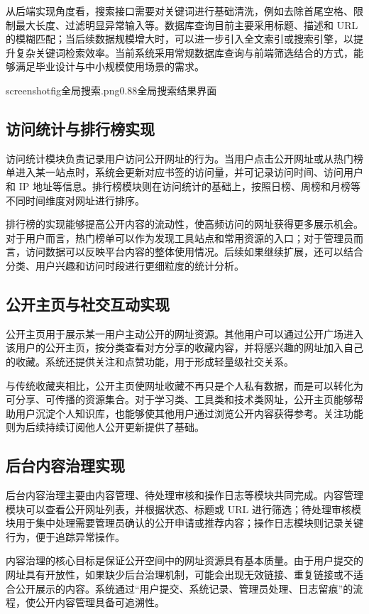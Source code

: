 \documentclass[12pt,a4paper]{ctexart}
\begin{document}
从后端实现角度看，搜索接口需要对关键词进行基础清洗，例如去除首尾空格、限制最大长度、过滤明显异常输入等。数据库查询目前主要采用标题、描述和 URL 的模糊匹配；当后续数据规模增大时，可以进一步引入全文索引或搜索引擎，以提升复杂关键词检索效率。当前系统采用常规数据库查询与前端筛选结合的方式，能够满足毕业设计与中小规模使用场景的需求。

screenshotfig{全局搜索.png}{0.88}{全局搜索结果界面}

\subsection{访问统计与排行榜实现}
访问统计模块负责记录用户访问公开网址的行为。当用户点击公开网址或从热门榜单进入某一站点时，系统会更新对应书签的访问量，并可记录访问时间、访问用户和 IP 地址等信息。排行榜模块则在访问统计的基础上，按照日榜、周榜和月榜等不同时间维度对网址进行排序。

排行榜的实现能够提高公开内容的流动性，使高频访问的网址获得更多展示机会。对于用户而言，热门榜单可以作为发现工具站点和常用资源的入口；对于管理员而言，访问数据可以反映平台内容的整体使用情况。后续如果继续扩展，还可以结合分类、用户兴趣和访问时段进行更细粒度的统计分析。

\subsection{公开主页与社交互动实现}
公开主页用于展示某一用户主动公开的网址资源。其他用户可以通过公开广场进入该用户的公开主页，按分类查看对方分享的收藏内容，并将感兴趣的网址加入自己的收藏。系统还提供关注和点赞功能，用于形成轻量级社交关系。

与传统收藏夹相比，公开主页使网址收藏不再只是个人私有数据，而是可以转化为可分享、可传播的资源集合。对于学习类、工具类和技术类网址，公开主页能够帮助用户沉淀个人知识库，也能够使其他用户通过浏览公开内容获得参考。关注功能则为后续持续订阅他人公开更新提供了基础。

\subsection{后台内容治理实现}
后台内容治理主要由内容管理、待处理审核和操作日志等模块共同完成。内容管理模块可以查看公开网址列表，并根据状态、标题或 URL 进行筛选；待处理审核模块用于集中处理需要管理员确认的公开申请或推荐内容；操作日志模块则记录关键行为，便于追踪异常操作。

内容治理的核心目标是保证公开空间中的网址资源具有基本质量。由于用户提交的网址具有开放性，如果缺少后台治理机制，可能会出现无效链接、重复链接或不适合公开展示的内容。系统通过“用户提交、系统记录、管理员处理、日志留痕”的流程，使公开内容管理具备可追溯性。
\end{document}
